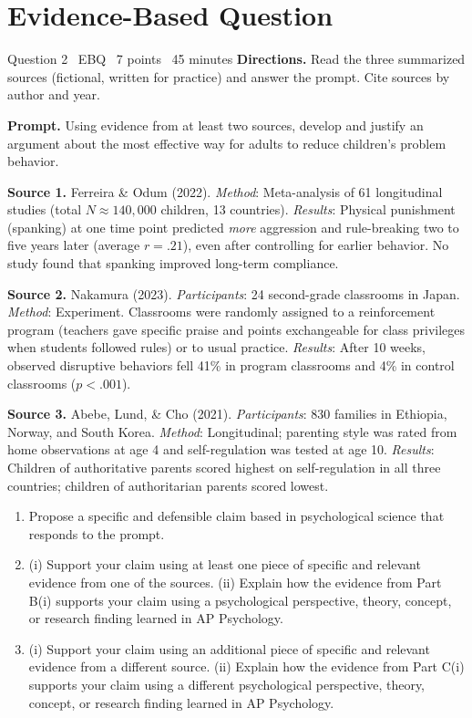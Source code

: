 \documentclass[11pt]{article}
\begin{document}
\section{Evidence-Based Question}

\begin{frq}{Question 2 \textperiodcentered\ EBQ \textperiodcentered\ 7 points \textperiodcentered\ 45 minutes}
\small
\textbf{Directions.} Read the three summarized sources (fictional, written for practice) and answer the prompt. Cite sources by author and year.

\textbf{Prompt.} Using evidence from at least two sources, develop and justify an argument about the most effective way for adults to reduce children's problem behavior.

\medskip
\textbf{Source 1.} Ferreira \& Odum (2022). \emph{Method}: Meta-analysis of 61 longitudinal studies (total \(N \approx 140{,}000\) children, 13 countries). \emph{Results}: Physical punishment (spanking) at one time point predicted \emph{more} aggression and rule-breaking two to five years later (average \(r = .21\)), even after controlling for earlier behavior. No study found that spanking improved long-term compliance.

\textbf{Source 2.} Nakamura (2023). \emph{Participants}: 24 second-grade classrooms in Japan. \emph{Method}: Experiment. Classrooms were randomly assigned to a reinforcement program (teachers gave specific praise and points exchangeable for class privileges when students followed rules) or to usual practice. \emph{Results}: After 10 weeks, observed disruptive behaviors fell 41\% in program classrooms and 4\% in control classrooms (\(p < .001\)).

\textbf{Source 3.} Abebe, Lund, \& Cho (2021). \emph{Participants}: 830 families in Ethiopia, Norway, and South Korea. \emph{Method}: Longitudinal; parenting style was rated from home observations at age 4 and self-regulation was tested at age 10. \emph{Results}: Children of authoritative parents scored highest on self-regulation in all three countries; children of authoritarian parents scored lowest.

\medskip
\begin{enumerate}[label=(\Alph*),leftmargin=2em,itemsep=3pt]
\item Propose a specific and defensible claim based in psychological science that responds to the prompt.
\item (i) Support your claim using at least one piece of specific and relevant evidence from one of the sources. (ii) Explain how the evidence from Part B(i) supports your claim using a psychological perspective, theory, concept, or research finding learned in AP Psychology.
\item (i) Support your claim using an additional piece of specific and relevant evidence from a different source. (ii) Explain how the evidence from Part C(i) supports your claim using a different psychological perspective, theory, concept, or research finding learned in AP Psychology.
\end{enumerate}
\end{frq}
\end{document}
